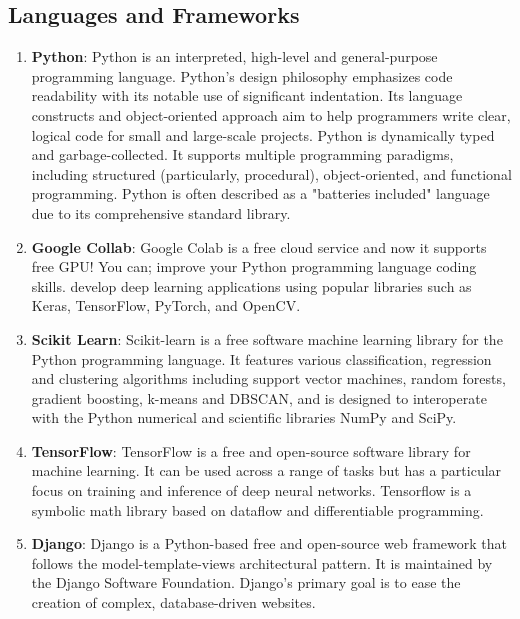 \documentclass[./main.tex]{subfiles}
\begin{document}
\subsection {Languages and Frameworks}
\begin{enumerate}[label=\ensuremath{\diamond}]
  \item \textbf{Python}: Python is an interpreted, high-level and general-purpose programming language. Python's design philosophy emphasizes code readability with its notable use of significant indentation. Its language constructs and object-oriented approach aim to help programmers write clear, logical code for small and large-scale projects. Python is dynamically typed and garbage-collected. It supports multiple programming paradigms, including structured (particularly, procedural), object-oriented, and functional programming. Python is often described as a "batteries included" language due to its comprehensive standard library. 
  \item \textbf {Google Collab}: Google Colab is a free cloud service and now it supports free GPU! You can; improve your Python programming language coding skills. develop deep learning applications using popular libraries such as Keras, TensorFlow, PyTorch, and OpenCV.
  \item \textbf{Scikit Learn}: Scikit-learn is a free software machine learning library for the Python programming language. It features various classification, regression and clustering algorithms including support vector machines, random forests, gradient boosting, k-means and DBSCAN, and is designed to interoperate with the Python numerical and scientific libraries NumPy and SciPy.
  \item \textbf{TensorFlow}: TensorFlow is a free and open-source software library for machine learning. It can be used across a range of tasks but has a particular focus on training and inference of deep neural networks. Tensorflow is a symbolic math library based on dataflow and differentiable programming.
  \item \textbf{Django}: Django is a Python-based free and open-source web framework that follows the model-template-views architectural pattern. It is maintained by the Django Software Foundation. Django's primary goal is to ease the creation of complex, database-driven websites. \cite{python}
\end{enumerate}
\end{document}
